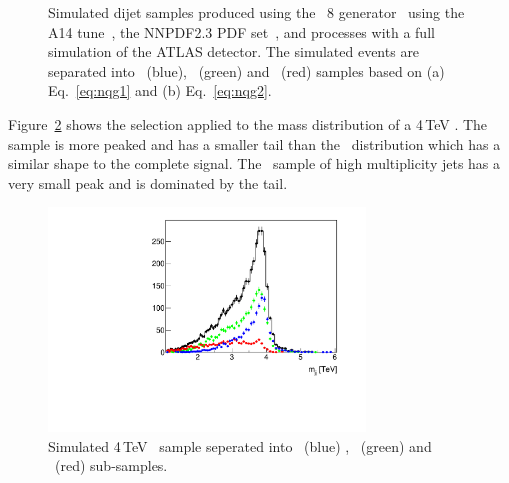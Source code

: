 \begin{figure}[htb]
 \centering

\caption{Simulated dijet samples produced using the 
\Pythia~8 generator~\cite{pythia8} using the A14 tune~\cite{A14tune}, the NNPDF2.3 PDF set~\cite{Carrazza:2013axa}, 
and processes with a full simulation of the ATLAS detector. The simulated events are separated into \QQ\ (blue),
\QG\ (green) and \GG\ (red) samples  based on (a) Eq.~\ref{eq:nqg1} and
(b) Eq.~\ref{eq:nqg2}.  \label{fig:pythia_qg_selection}}
\end{figure}

Figure~\ref{fig:QG_qstar_4tev} shows the selection applied to the mass distribution of a 4\,TeV \qstar . The  
\QQ sample is more peaked and has a smaller tail than the \QG\ distribution which has a similar shape to the complete signal. The \GG\ sample of high multiplicity jets has a very small peak and is dominated by the tail.

\begin{figure}[htb]
 \centering
\includegraphics[width=0.75\textwidth]{figures/tagging/QG_qstar_4tev.pdf}
\caption{Simulated 4\,TeV \qstar\ sample seperated into \QQ\ (blue) , \QG\ (green) and \GG\ (red) 
sub-samples.  \label{fig:QG_qstar_4tev}}
\end{figure}

